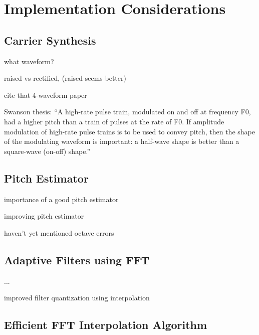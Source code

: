 \documentclass [11pt, proquest,oneside] {ganter_thesis}[2015/03/03]
\begin{document}


\section{Implementation Considerations}

\subsection{Carrier Synthesis}

what waveform?

raised vs rectified, (raised seems better)

cite that 4-waveform paper

Swanson thesis: ``A high-rate pulse train, modulated on and off at frequency F0, had a higher pitch than a train of pulses at the rate of F0. If amplitude modulation of high-rate pulse trains is to be used to convey pitch, then the shape of the modulating waveform is important: a half-wave shape is better than a square-wave (on-off) shape.''

\subsection{Pitch Estimator}

importance of a good pitch estimator

improving pitch estimator

haven't yet mentioned octave errors

\subsection{Adaptive Filters using FFT}

...

improved filter quantization using interpolation

\subsection{Efficient FFT Interpolation Algorithm}
\end{document}
